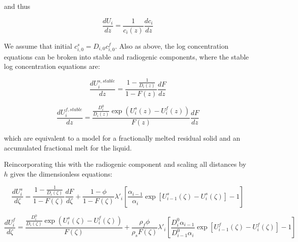 \documentclass[draft]{agujournal2019}
\begin{document}
and thus

\begin{linenomath*}
\begin{equation}
    \frac{dU_i}{dz} = \frac{1}{c_i(z)} \frac{dc_i}{dz}\label{eq:24}
\end{equation}
\end{linenomath*}

We assume that initial $c_{i,0}^s = D_{i,0} c_{i,0}^f$. Also as above, the log concentration equations can be broken into stable and radiogenic components, where the stable log concentration equations are:

\begin{linenomath*}
\begin{equation}
    \frac{dU_{i}^{s,stable}}{dz} = \frac{1-\frac{1}{D_i(z)}}{1-F(z)} \frac{dF}{dz}\label{eq:25}
\end{equation}
\end{linenomath*}

\begin{linenomath*}
\begin{equation}
    \frac{dU_{i}^{f,stable}}{dz} = \frac{\frac{D_i^0}{D_i(z)} \exp(U_i^s(z)-U_i^f(z))}{F(z)}  \frac{dF}{dz}\label{eq:26}
\end{equation}
\end{linenomath*}

which are equivalent to a model for a fractionally melted residual solid and an accumulated fractional melt for the liquid.

Reincorporating this with the radiogenic component and scaling all distances by $h$ gives the dimensionless equations:

\begin{linenomath*}
\begin{equation}
    \frac{dU_{i}^{s}}{d\zeta} = \frac{1-\frac{1}{D_i(\zeta)}}{1-F(\zeta)} \frac{dF}{d\zeta} + \frac{1-\phi}{1-F(\zeta)}\lambda'_i \left[\frac{\alpha_{i-1}}{\alpha_i} \exp[U_{i-1}^s(\zeta) - U_i^s(\zeta)]-1\right]\label{eq:27}
\end{equation}
\end{linenomath*}

\begin{linenomath*}
\begin{equation}
    \frac{dU_{i}^{f}}{d\zeta} = \frac{\frac{D_i^0}{D_i(\zeta)} \exp(U_i^s(\zeta)-U_i^f(\zeta))}{F(\zeta)} + \frac{\rho_f \phi}{\rho_s F(\zeta)}\lambda'_i \left[\frac{D_i^0 \alpha_{i-1}}{D_{i-1}^0 \alpha_i} \exp[U_{i-1}^f(\zeta) - U_i^f(\zeta)]-1\right]\label{eq:28}
\end{equation}
\end{linenomath*}
\end{document}
